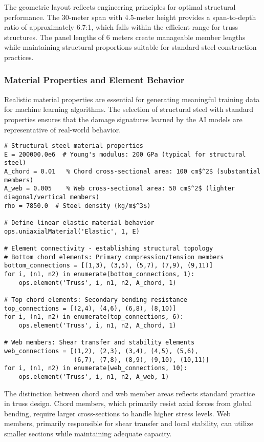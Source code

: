 \documentclass[11pt,a4paper]{article}
\begin{document}
The geometric layout reflects engineering principles for optimal structural performance. The 30-meter span with 4.5-meter height provides a span-to-depth ratio of approximately 6.7:1, which falls within the efficient range for truss structures. The panel lengths of 6 meters create manageable member lengths while maintaining structural proportions suitable for standard steel construction practices.

\subsubsection{Material Properties and Element Behavior}

Realistic material properties are essential for generating meaningful training data for machine learning algorithms. The selection of structural steel with standard properties ensures that the damage signatures learned by the AI models are representative of real-world behavior.

\begin{lstlisting}[caption={Material Properties and Element Creation}]
# Structural steel material properties
E = 200000.0e6  # Young's modulus: 200 GPa (typical for structural steel)
A_chord = 0.01   % Chord cross-sectional area: 100 cm$^2$ (substantial members)
A_web = 0.005    % Web cross-sectional area: 50 cm$^2$ (lighter diagonal/vertical members)
rho = 7850.0  # Steel density (kg/m$^3$)

# Define linear elastic material behavior
ops.uniaxialMaterial('Elastic', 1, E)

# Element connectivity - establishing structural topology
# Bottom chord elements: Primary compression/tension members
bottom_connections = [(1,3), (3,5), (5,7), (7,9), (9,11)]
for i, (n1, n2) in enumerate(bottom_connections, 1):
    ops.element('Truss', i, n1, n2, A_chord, 1)
    
# Top chord elements: Secondary bending resistance
top_connections = [(2,4), (4,6), (6,8), (8,10)]
for i, (n1, n2) in enumerate(top_connections, 6):
    ops.element('Truss', i, n1, n2, A_chord, 1)

# Web members: Shear transfer and stability elements
web_connections = [(1,2), (2,3), (3,4), (4,5), (5,6), 
                   (6,7), (7,8), (8,9), (9,10), (10,11)]
for i, (n1, n2) in enumerate(web_connections, 10):
    ops.element('Truss', i, n1, n2, A_web, 1)
\end{lstlisting}

The distinction between chord and web member areas reflects standard practice in truss design. Chord members, which primarily resist axial forces from global bending, require larger cross-sections to handle higher stress levels. Web members, primarily responsible for shear transfer and local stability, can utilize smaller sections while maintaining adequate capacity.
\end{document}

